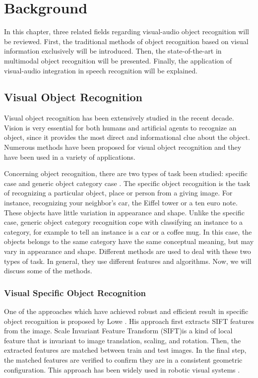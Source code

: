 \chapter{Background}\label{background}

In this chapter, three related fields regarding visual-audio object recognition will be reviewed. First, the traditional methods of object recognition based on visual information exclusively will be introduced. Then, the state-of-the-art in multimodal object recognition will be presented. Finally, the application of visual-audio integration in speech recognition will be explained.

\section{Visual Object Recognition}
Visual object recognition has been extensively studied in the recent decade. Vision is very essential for both humans and artificial agents to recognize an object, since it provides the most direct and informational clue about the object. Numerous methods have been proposed for visual object recognition and they have been used in a variety of applications.

Concerning object recognition, there are two types of task been studied: specific case and generic object category case \cite{grauman_visual_2011}. The specific object recognition is the task of recognizing a particular object, place or person from a giving image. For instance, recognizing your neighbor's car, the Eiffel tower or a ten euro note. These objects have little variation in appearance and shape. Unlike the specific case, generic object category recognition cope with classifying an instance to a category, for example to tell an instance is a car or a coffee mug. In this case, the objects belongs to the same category have the same conceptual meaning, but may vary in appearance and shape. Different methods are used to deal with these two types of task. In general, they use different features and algorithms. Now, we will discuss some of the methods.

\subsection{Visual Specific Object Recognition}
One of the approaches which have achieved robust and efficient result in specific object recognition is proposed by Lowe \cite{lowe_object_1999}. His approach first extracts SIFT features from the image. Scale Invariant Feature Transform (SIFT)is a kind of local feature that is invariant to image translation, scaling, and rotation. Then, the extracted features are matched between train and test images. In the final step, the matched features are verified to confirm they are in a consistent geometric configuration. This approach has been widely used in robotic visual systems \cite{grauman_visual_2011}.

